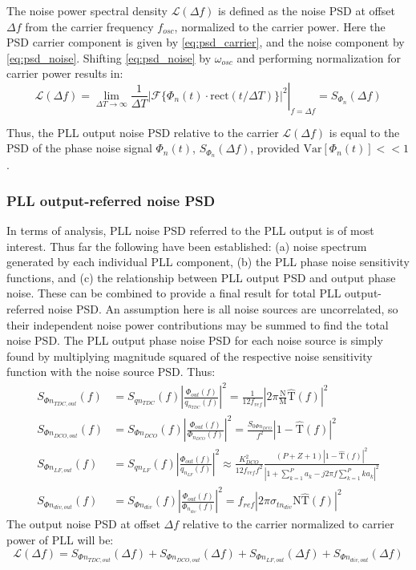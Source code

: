 	 The noise power spectral density $\mathcal{L}(\Delta f)$ is defined as the noise PSD at offset $\Delta f$ from the carrier frequency $f_{osc}$, normalized to the carrier power. Here the PSD carrier component is given by \ref{eq:psd_carrier}, and the noise component by \ref{eq:psd_noise}. Shifting \ref{eq:psd_noise} by $\omega_{osc}$ and performing normalization for carrier power results in:
	\begin{equation}\label{eq:pn_psd_relation}
		\mathcal{L}(\Delta f) = \left.\lim_{\Delta T\rightarrow\infty}\frac{1}{\Delta T}|\mathcal{F}\{\Phi_{n}(t)\cdot\mathrm{rect}(t/\Delta T)\}|^2 \right|_{f=\Delta f}= S_{\Phi_{n}}(\Delta f)
	\end{equation}

	Thus, the PLL output noise PSD relative to the carrier $\mathcal{L}(\Delta f)$ is equal to the PSD of the phase noise signal $\Phi_{n}(t)$, $S_{\Phi_{n}}(\Delta f)$, provided $\text{Var}[\Phi_{n}(t)] << 1$. 

\subsubsection{PLL output-referred noise PSD}\label{final_pn_model}
In terms of analysis, PLL noise PSD referred to the PLL output is of most interest. Thus far the following have been established: (a) noise spectrum generated by each individual PLL component, (b) the PLL phase noise sensitivity functions, and (c) the relationship between PLL output PSD and output phase noise. These can be combined to provide a final result for total PLL output-referred noise PSD. An assumption here is all noise sources are uncorrelated, so their independent noise power contributions may be summed to find the total noise PSD. The PLL output phase noise PSD for each noise source is simply found by multiplying magnitude squared of the respective noise sensitivity function with the noise source PSD. Thus:
\begin{align}
	S_{\Phi n_{TDC,out}}(f) &= S_{qn_{TDC}}(f)\left|\frac{\Phi_{out}(f)}{q_{n_{TDC}}(f)}\right|^2 = \frac{1}{12f_{ref}}\left|2\pi\frac{\mathrm{N}}{\mathrm{M}}\hat{\mathrm{T}}(f)\right|^2\\
	S_{\Phi n_{DCO,out}}(f) &= S_{\Phi n_{DCO}}(f)\left|\frac{\Phi_{out}(f)}{\Phi_{n_{DCO}}(f)}\right|^2  = \frac{S_{0\Phi n_{DCO}}}{f^2}\left|1-\hat{\mathrm{T}}(f)\right|^2\\		
	S_{\Phi n_{LF,out}}(f) &= S_{q n_{LF}}(f)\left|\frac{\Phi_{out}(f)}{q_{n_{LF}}(f)}\right|^2 \approx \frac{K_{DCO}^2}{12f_{ref}f^2}\frac{(P+Z+1)|1-\hat{\mathrm{T}}(f)|^2}{\left|1+\sum_{k=1}^P a_k - j2\pi f\sum_{k=1}^P ka_k\right|^2}\\
	S_{\Phi n_{div,out}}(f) &= S_{\Phi n_{div}}(f)\left|\frac{\Phi_{out}(f)}{\Phi_{n_{div}}(f)}\right|^2 = f_{ref}\left|2\pi\sigma_{tn_{div}}\mathrm{N}\hat{\mathrm{T}}(f)\right|^2
\end{align}
The output noise PSD at offset $\Delta f$ relative to the carrier normalized to carrier power of PLL will be:
\begin{equation}
	\mathcal{L}(\Delta f) = S_{\Phi n_{TDC,out}}(\Delta f) + S_{\Phi n_{DCO,out}}(\Delta f) + S_{\Phi n_{LF,out}}(\Delta f) + S_{\Phi n_{div,out}}(\Delta f)
\end{equation}

